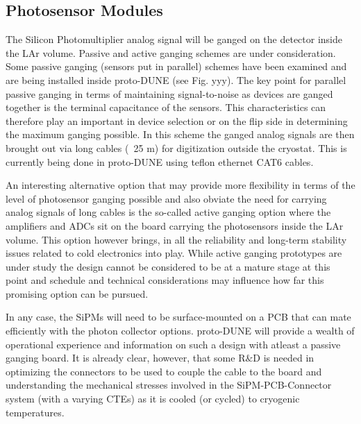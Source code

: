 


\subsection{Photosensor Modules}
\label{sec:fdsp-pd-assy-psm}

The Silicon Photomultiplier analog signal will be ganged on the detector inside the
LAr volume. Passive and active ganging schemes are under consideration. Some passive
ganging (sensors put in parallel) schemes have been examined and are being installed inside
proto-DUNE (see Fig. yyy). The key point for parallel passive ganging in terms of 
maintaining signal-to-noise as devices are ganged together is the terminal capacitance of the 
sensors. This characteristics can therefore play an important in device selection or on
the flip side in determining the maximum ganging possible. In this scheme the 
ganged analog signals are then brought out via long cables (~25 m) for digitization outside
the cryostat. This is currently being done in proto-DUNE using teflon ethernet CAT6 cables.

An interesting alternative option that may provide more flexibility in terms of the level of
photosensor ganging possible and also obviate the need for carrying analog signals of long cables
is the so-called active ganging option where the amplifiers and ADCs sit on the board carrying 
the photosensors inside the LAr volume. This option however brings, in all the reliability and long-term
stability issues related to cold electronics into play. While active ganging prototypes are under study 
the design cannot be considered to be at a mature stage at this point and schedule and technical
considerations may influence how far this promising option can be pursued.

In any case, the SiPMs will need to be surface-mounted on a PCB that can mate efficiently with the photon
collector options. proto-DUNE will provide a wealth of operational experience and information on
such a design with atleast a passive ganging board. It is already clear, however, that some R$\&$D is needed 
in optimizing the connectors to be used to couple the cable to the board and understanding the 
mechanical stresses involved in the SiPM-PCB-Connector system (with a varying CTEs) as it
is cooled (or cycled) to cryogenic temperatures.



